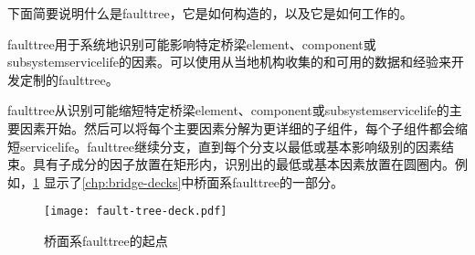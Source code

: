 下面简要说明什么是\gls*{faulttree}，它是如何构造的，以及它是如何工作的。

\gls*{faulttree}用于系统地识别可能影响特定桥梁\gls*{element}、\gls*{component}或\gls*{subsystem}\gls*{servicelife}的因素。可以使用从当地机构收集的和可用的数据和经验来开发定制的\gls*{faulttree}。


\gls*{faulttree}从识别可能缩短特定桥梁\gls{element}、\gls{component}或\gls{subsystem}\gls{servicelife}的主要因素开始。然后可以将每个主要因素分解为更详细的子组件，每个子组件都会缩短\gls{servicelife}。\gls*{faulttree}继续分支，直到每个分支以最低或基本影响级别的因素结束。具有子成分的因子放置在矩形内，识别出的最低或基本因素放置在圆圈内。例如，\cref{fig:fault-tree-deck} 显示了\cref{chp:bridge-decks}中桥面系\gls*{faulttree}的一部分。

\begin{figure}
  \texttt{[image: fault-tree-deck.pdf]}
  \caption{桥面系\gls*{faulttree}的起点}\label{fig:fault-tree-deck}
\end{figure}


